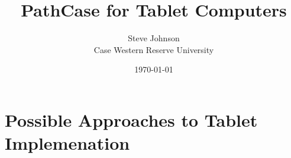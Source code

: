 \documentclass[12pt]{article}
\title{PathCase for Tablet Computers}
\author{Steve Johnson\\
        Case Western Reserve University\\
}
\date{\today}
\begin{document}
\doublespacing

\maketitle



\section{Possible Approaches to Tablet Implemenation}














\nocite{*}


\end{document}
